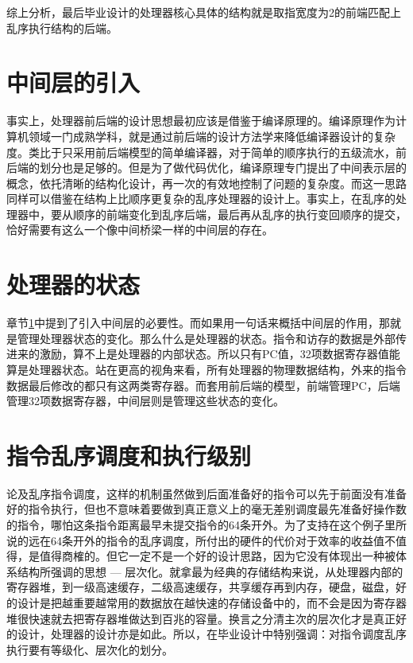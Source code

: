 综上分析，最后毕业设计的处理器核心具体的结构就是取指宽度为2的前端匹配上乱序执行结构的后端。

\section{中间层的引入}\label{subsec:middle_end}
事实上，处理器前后端的设计思想最初应该是借鉴于编译原理的。编译原理作为计算机领域一门成熟学科，就是通过前后端的设计方法学来降低编译器设计的复杂度。类比于只采用前后端模型的简单编译器，对于简单的顺序执行的五级流水，前后端的划分也是足够的。但是为了做代码优化，编译原理专门提出了中间表示层的概念，依托清晰的结构化设计，再一次的有效地控制了问题的复杂度。而这一思路同样可以借鉴在结构上比顺序更复杂的乱序处理器的设计上。事实上，在乱序的处理器中，要从顺序的前端变化到乱序后端，最后再从乱序的执行变回顺序的提交，恰好需要有这么一个像中间桥梁一样的中间层的存在。

\section{处理器的状态}\label{subsec:cpu_state}
章节\ref{subsec:middle_end}中提到了引入中间层的必要性。而如果用一句话来概括中间层的作用，那就是管理处理器状态的变化。那么什么是处理器的状态。指令和访存的数据是外部传进来的激励，算不上是处理器的内部状态。所以只有PC值，32项数据寄存器值能算是处理器状态。站在更高的视角来看，所有处理器的物理数据结构，外来的指令数据最后修改的都只有这两类寄存器。而套用前后端的模型，前端管理PC，后端管理32项数据寄存器，中间层则是管理这些状态的变化。

\section{指令乱序调度和执行级别}\label{subsec:exe_hierarchy}
论及乱序指令调度，这样的机制虽然做到后面准备好的指令可以先于前面没有准备好的指令执行，但也不意味着要做到真正意义上的毫无差别调度最先准备好操作数的指令，哪怕这条指令距离最早未提交指令的64条开外。为了支持在这个例子里所说的远在64条开外的指令的乱序调度，所付出的硬件的代价对于效率的收益值不值得，是值得商榷的。但它一定不是一个好的设计思路，因为它没有体现出一种被体系结构所强调的思想 --- 层次化。就拿最为经典的存储结构来说，从处理器内部的寄存器堆，到一级高速缓存，二级高速缓存，共享缓存再到内存，硬盘，磁盘，好的设计是把越重要越常用的数据放在越快速的存储设备中的，而不会是因为寄存器堆很快速就去把寄存器堆做达到百兆的容量。换言之分清主次的层次化才是真正好的设计，处理器的设计亦是如此。所以，在毕业设计中特别强调：对指令调度乱序执行要有等级化、层次化的划分。

